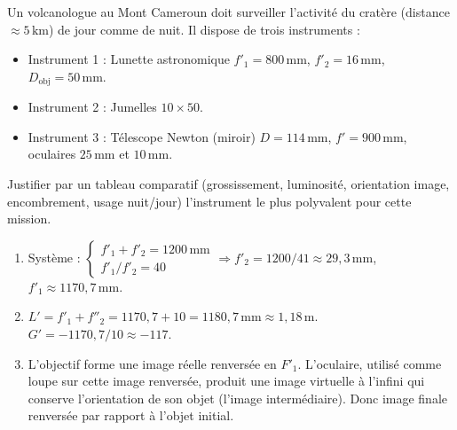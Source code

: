 \documentclass[11pt]{article}
\begin{document}
\begin{exercice}
Un volcanologue au Mont Cameroun doit surveiller l'activité du cratère (distance $\approx 5\,\text{km}$) de jour comme de nuit. Il dispose de trois instruments :
\begin{itemize}
    \item Instrument 1 : Lunette astronomique $f'_1 = 800\,\text{mm}$, $f'_2 = 16\,\text{mm}$, $D_{\text{obj}} = 50\,\text{mm}$.
    \item Instrument 2 : Jumelles $10 \times 50$.
    \item Instrument 3 : Télescope Newton (miroir) $D = 114\,\text{mm}$, $f' = 900\,\text{mm}$, oculaires $25\,\text{mm}$ et $10\,\text{mm}$.
\end{itemize}
Justifier par un tableau comparatif (grossissement, luminosité, orientation image, encombrement, usage nuit/jour) l'instrument le plus polyvalent pour cette mission.
\end{exercice}

\begin{corrige}[Exercice 1]
\begin{enumerate}
    \item Système : $\begin{cases} f'_1 + f'_2 = 1200\,\text{mm} \\ f'_1/f'_2 = 40 \end{cases} \Rightarrow f'_2 = 1200/41 \approx 29,3\,\text{mm}$, $f'_1 \approx 1170,7\,\text{mm}$.
    \item $L' = f'_1 + f''_2 = 1170,7 + 10 = 1180,7\,\text{mm} \approx 1,18\,\text{m}$. $G' = -1170,7/10 \approx -117$.
    \item L'objectif forme une image réelle renversée en $F'_1$. L'oculaire, utilisé comme loupe sur cette image renversée, produit une image virtuelle à l'infini qui conserve l'orientation de son objet (l'image intermédiaire). Donc image finale renversée par rapport à l'objet initial.
\end{enumerate}
\end{corrige}
\end{document}
